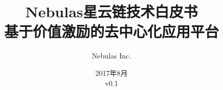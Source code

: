 \documentclass[11.5pt]{article}
\begin{document}
\renewcommand{\contentsname}{目录}
\renewcommand{\abstractname}{摘要}
\renewcommand{\refname}{参考文献}
\renewcommand{\nomname}{术语表}
\renewcommand{\figurename}{图}
\renewcommand{\tablename}{表}
\renewcommand{\baselinestretch}{1.5}
\renewcommand{\appendixname}{附录}

\title{
	Nebulas星云链技术白皮书 \\
	\large 基于价值激励的去中心化应用平台}
\author{Nebulas Inc.}
\date{2017年8月\\v0.1}

\maketitle

\newpage

\tableofcontents

\printnomenclature


\newpage

\newpage

\newpage

\newpage

\newpage

\newpage

\newpage

\newpage

\newpage
%
\printbibliography

\begin{appendices}

\end{appendices}

%
\end{document}
